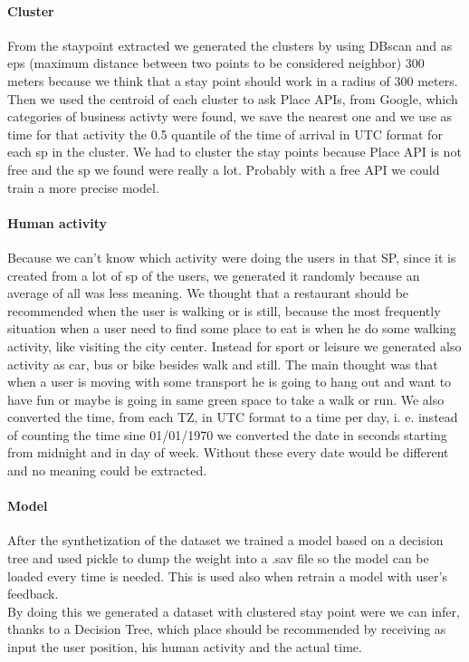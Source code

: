 \documentclass[../../main]{subfiles}
\begin{document}
\paragraph{Cluster}
From the staypoint extracted we generated the clusters by using DBscan and as eps (maximum distance between two points to be considered neighbor) 
300 meters because we think that a stay point should work in a radius of 300 meters. Then we used the centroid of each cluster to ask Place APIs, from Google, 
which categories of business activty were found, we save the nearest one and we use as time for that activity the 0.5 quantile of the time of arrival in UTC format for each sp in the cluster.
We had to cluster the stay points because Place API is not free and the sp we found were really a lot. Probably with a free API we could train a more precise model.

\paragraph{Human activity}
Because we can't know which activity were doing the users in that SP, since it is created from a lot of sp of the users, we generated it randomly 
because an average of all was less meaning. We thought that a restaurant should be recommended when the user is walking or is still, because
the most frequently situation when a user need to find some place to eat is when he do some walking activity, like visiting the city center.
Instead for sport or leisure we generated also activity as car, bus or bike besides walk and still. The main thought was that when a user is moving with 
some transport he is going to hang out and want to have fun or maybe is going in same green space to take a walk or run.
We also converted the time, from each TZ, in UTC format to a time per day, i. e. instead of counting the time sine 01/01/1970 we converted the date in seconds starting from midnight and 
in day of week. Without these every date would be different and no meaning could be extracted.

\paragraph{Model}
After the synthetization of the dataset we trained a model based on a decision tree and used pickle to dump the weight into a .sav file so the model can be loaded 
every time is needed. This is used also when retrain a model with user's feedback.
\\
By doing this we generated a dataset with clustered stay point were we can infer, thanks to a Decision Tree, which place should be recommended by 
receiving as input the user position, his human activity and the actual time.
\end{document}
